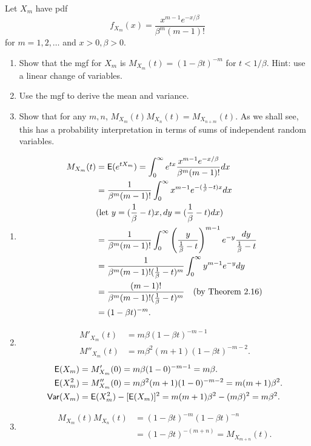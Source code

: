 \documentclass[12pt]{article}
\newcommand{\E}{{\sf E}}
\newcommand{\Var}{{\sf Var}}
\newenvironment{problem}[2][Problem]{\begin{trivlist}
\item[\hskip \labelsep {\bfseries #1}\hskip \labelsep {\bfseries #2.}]}
{\end{trivlist}}
\begin{document}
\begin{problem}{9}
  Let $X_m$ have pdf 
  \[
    f_{X_m}(x) = \frac{x^{m-1} e^{-x/\beta}}{\beta^m (m-1)!}
  \] 
  for $m = 1, 2, \ldots$ and $x > 0, \beta > 0$.
  \begin{enumerate}
    \item Show that the mgf for $X_m$ is 
    $M_{X_m}(t) = (1 - \beta t)^{-m}$ 
    for $t < 1/\beta$. Hint: use a linear change of variables.
    \item Use the mgf to derive the mean and variance.
    \item Show that for any $m, n$, $M_{X_m}(t)M_{X_n}(t) = M_{X_{n+m}}(t)$. 
    As we shall see, this has a probability interpretation in 
    terms of sums of independent random variables.
  \end{enumerate}
  \begin{enumerate}
    \item \[
      \begin{aligned}
        M_{X_m}(t) &= \E(e^{tX_m}) = \int_{0}^{\infty} e^{tx} 
        \frac{x^{m-1} e^{-x/\beta}}{\beta^m (m-1)!} dx \\
        &= \frac{1}{\beta^m (m-1)!} \int_{0}^{\infty} x^{m-1} 
        e^{-(\frac{1}{\beta} - t)x} dx \\
        &(\text{let } y = (\frac{1}{\beta} - t)x, dy = 
        (\frac{1}{\beta} - t)dx) \\
        &= \frac{1}{\beta^m (m-1)!} \int_{0}^{\infty} 
        \left(\frac{y}{\frac{1}{\beta} - t}\right)^{m-1} 
        e^{-y} \frac{dy}{\frac{1}{\beta} - t} \\
        &= \frac{1}{\beta^m (m-1)! (\frac{1}{\beta} - t)^m}
        \int_{0}^{\infty} y^{m-1} e^{-y} dy \\
        &= \frac{(m-1)!}{\beta^m (m-1)! (\frac{1}{\beta} - t)^m}
        \quad (\text{by Theorem 2.16})\\
        &= (1 - \beta t)^{-m}.
      \end{aligned}
    \]
    \item \[
      \begin{aligned}
        M'_{X_m}(t) &= m\beta (1 - \beta t)^{-m-1} \\
        M''_{X_m}(t) &= m\beta^2 (m+1) (1 - \beta t)^{-m-2}.
      \end{aligned}
    \]
    \[
      \begin{aligned}
        \E(X_m) &= M'_{X_m}(0) = m\beta (1 - 0)^{-m-1} = m\beta. \\
        \E(X_m^2) &= M''_{X_m}(0) = m\beta^2 (m+1) (1 - 0)^{-m-2} 
        = m(m+1)\beta^2. \\
        \Var(X_m) &= \E(X_m^2) - [\E(X_m)]^2 
        = m(m+1)\beta^2 - (m\beta)^2 = m\beta^2.
      \end{aligned}
    \]
    \item \[
      \begin{aligned}
        M_{X_m}(t)M_{X_n}(t) &= (1 - \beta t)^{-m} (1 - \beta t)^{-n} \\
        &= (1 - \beta t)^{-(m+n)} = M_{X_{m+n}}(t).
      \end{aligned}
    \]
  \end{enumerate}
\end{problem}


\end{document}
